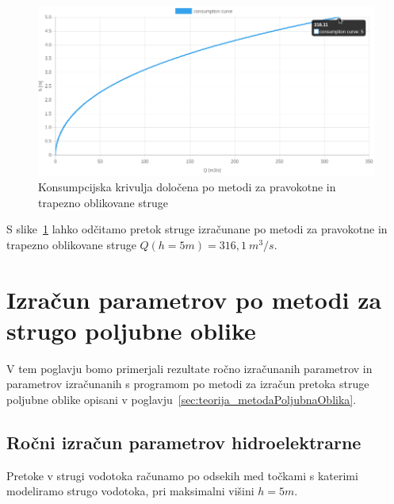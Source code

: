 \begin{figure}[H]
	\begin{centering}
		\includegraphics[width=\textwidth]{slike/izracuni/trapeznaMetoda_konsumpcijska.png}\caption{Konsumpcijska krivulja določena po metodi za pravokotne in trapezno oblikovane struge}\label{fig:trapeznaMetoda_konsumpcijskaKrivulja}
	\end{centering}
\end{figure}



S slike~\ref{fig:trapeznaMetoda_konsumpcijskaKrivulja} lahko odčitamo pretok struge izračunane po metodi za pravokotne in trapezno oblikovane struge $Q(h=5m) = 316,1~m^3/s$. 


\section{Izračun parametrov po metodi za strugo poljubne oblike}\label{sec:izracun_numericnaMetoda}

V tem poglavju bomo primerjali rezultate ročno izračunanih parametrov in parametrov izračunanih s programom po metodi za izračun pretoka struge poljubne oblike opisani v poglavju~\ref{sec:teorija_metodaPoljubnaOblika}.


\subsection{Ročni izračun parametrov hidroelektrarne}\label{sec:izracun_rocno_numericnaMetoda}

Pretoke v strugi vodotoka računamo po odsekih med točkami s katerimi modeliramo strugo vodotoka, pri maksimalni višini $h=5m$.


